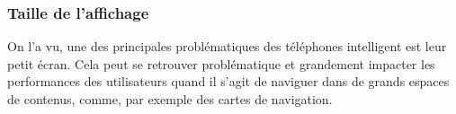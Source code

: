 






\subsubsection*{Taille de l'affichage}
On l'a vu, une des principales problématiques des téléphones intelligent est leur petit écran. Cela peut se retrouver problématique et grandement impacter les performances des utilisateurs quand il s'agit de naviguer dans de grands espaces de contenus, comme, par exemple des cartes de navigation.

